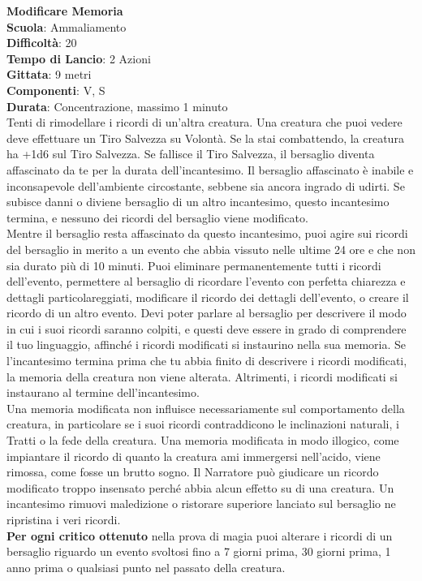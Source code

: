 \begin{multicols}{2}
\medskip\textbf{Modificare Memoria}\\
\textbf{Scuola}: Ammaliamento\\
\textbf{Difficoltà}:  20\\
\textbf{Tempo di Lancio}: 2 Azioni\\
\textbf{Gittata}: 9 metri\\
\textbf{Componenti}: V, S\\
\textbf{Durata}: Concentrazione, massimo 1 minuto\\
Tenti di rimodellare i ricordi di un'altra creatura. Una creatura che puoi vedere deve effettuare un Tiro Salvezza su Volontà. Se la stai combattendo, la creatura ha +1d6 sul Tiro Salvezza. Se fallisce il Tiro Salvezza, il bersaglio diventa affascinato da te per la durata dell'incantesimo. Il bersaglio affascinato è inabile e inconsapevole dell'ambiente circostante, sebbene sia ancora ingrado di udirti. Se subisce danni o diviene  bersaglio di un altro incantesimo, questo incantesimo  termina, e nessuno dei ricordi del bersaglio viene modificato.\\
Mentre il bersaglio resta affascinato da questo incantesimo, puoi agire sui ricordi del bersaglio in merito a un evento che abbia vissuto nelle ultime 24 ore e che non sia durato più di 10 minuti. Puoi eliminare permanentemente tutti i ricordi dell'evento, permettere al bersaglio di ricordare l’evento con perfetta chiarezza e dettagli particolareggiati, modificare il ricordo dei dettagli dell'evento, o creare il ricordo di un altro evento. Devi poter parlare al bersaglio per descrivere il modo in cui i suoi ricordi saranno colpiti, e questi deve essere in grado di comprendere il tuo linguaggio, affinché i ricordi modificati si instaurino nella sua memoria. Se l'incantesimo termina prima che tu abbia finito di descrivere i ricordi modificati, la memoria della creatura non viene alterata. Altrimenti, i ricordi modificati si instaurano al termine dell'incantesimo.\\
Una memoria modificata non influisce necessariamente sul comportamento della creatura, in particolare se i suoi ricordi contraddicono le inclinazioni naturali, i Tratti o la fede della creatura. Una memoria modificata in modo illogico, come impiantare il ricordo di quanto la creatura ami immergersi nell'acido, viene rimossa, come fosse un brutto sogno. Il Narratore può giudicare un ricordo modificato troppo insensato perché abbia alcun effetto su di una creatura. Un incantesimo rimuovi maledizione o ristorare superiore lanciato sul bersaglio ne ripristina i veri ricordi.\\
\textbf{Per ogni critico ottenuto} nella prova di magia puoi alterare i ricordi di un bersaglio riguardo un evento svoltosi fino a 7 giorni prima, 30 giorni prima, 1 anno prima o qualsiasi punto
nel passato della creatura.


\end{multicols}
